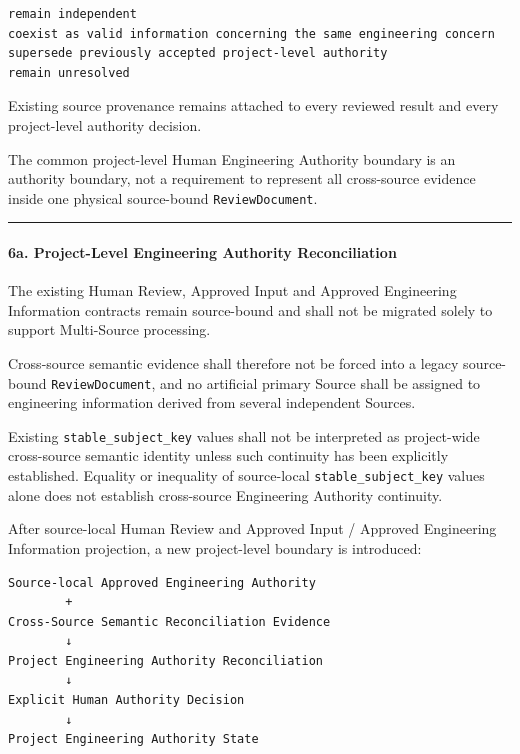 \begin{verbatim}
remain independent
coexist as valid information concerning the same engineering concern
supersede previously accepted project-level authority
remain unresolved
\end{verbatim}

Existing source provenance remains attached to every reviewed result and every project-level authority decision.

The common project-level Human Engineering Authority boundary is an authority boundary, not a requirement to represent all cross-source evidence inside one physical source-bound \texttt{ReviewDocument}.

\begin{center}\rule{0.5\linewidth}{0.5pt}\end{center}

\hypertarget{6a-project-level-engineering-authority-reconciliation}{%
\paragraph{6a. Project-Level Engineering Authority Reconciliation}\label{6a-project-level-engineering-authority-reconciliation}}

The existing Human Review, Approved Input and Approved Engineering Information contracts remain source-bound and shall not be migrated solely to support Multi-Source processing.

Cross-source semantic evidence shall therefore not be forced into a legacy source-bound \texttt{ReviewDocument}, and no artificial primary Source shall be assigned to engineering information derived from several independent Sources.

Existing \texttt{stable\_subject\_key} values shall not be interpreted as project-wide cross-source semantic identity unless such continuity has been explicitly established. Equality or inequality of source-local \texttt{stable\_subject\_key} values alone does not establish cross-source Engineering Authority continuity.

After source-local Human Review and Approved Input / Approved Engineering Information projection, a new project-level boundary is introduced:

\begin{verbatim}
Source-local Approved Engineering Authority
        +
Cross-Source Semantic Reconciliation Evidence
        ↓
Project Engineering Authority Reconciliation
        ↓
Explicit Human Authority Decision
        ↓
Project Engineering Authority State
\end{verbatim}

